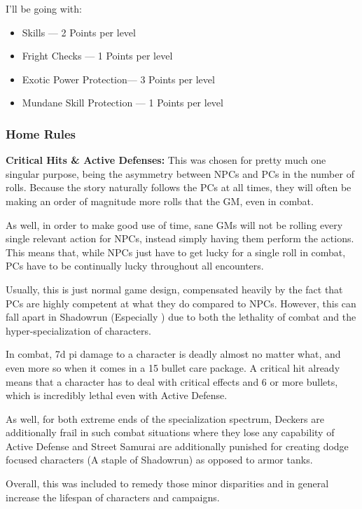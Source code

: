\begin{multicols*}{2}
	I'll be going with:
	
	\begin{itemize}
		\itemsep 0pt
		\item Skills — 2 Points per level
		\item Fright Checks — 1 Points per level
		\item Exotic Power Protection— 3 Points per level
		\item Mundane Skill Protection — 1 Points per level
	\end{itemize}
	
	
	
	
	\subsubsection{Home Rules}
	
	\textbf{Critical Hits \& Active Defenses:} This was chosen for pretty much one singular purpose, being the asymmetry between NPCs and PCs in the number of rolls. Because the story naturally follows the PCs at all times, they will often be making an order of magnitude more rolls that the GM, even in combat. 
	
	As well, in order to make good use of time, sane GMs will not be rolling every single relevant action for NPCs, instead simply having them perform the actions. This means that, while NPCs just have to get lucky for a single roll in combat, PCs have to be continually lucky throughout all encounters. 
	
	Usually, this is just normal game design, compensated heavily by the fact that PCs are highly competent at what they do compared to NPCs. However, this can fall apart in Shadowrun (Especially \GURPS) due to both the lethality of combat and the hyper-specialization of characters.
	
	In combat, 7d pi damage to a character is deadly almost no matter what, and even more so when it comes in a 15 bullet care package. A critical hit already means that a character has to deal with critical effects and 6 or more bullets, which is incredibly lethal even with Active Defense.
	
	As well, for both extreme ends of the specialization spectrum, Deckers are additionally frail in such combat situations where they lose any capability of Active Defense and Street Samurai are additionally punished for creating dodge focused characters (A staple of Shadowrun) as opposed to armor tanks.
	
	Overall, this was included to remedy those minor disparities and in general increase the lifespan of characters and campaigns.
	

\end{multicols*}
